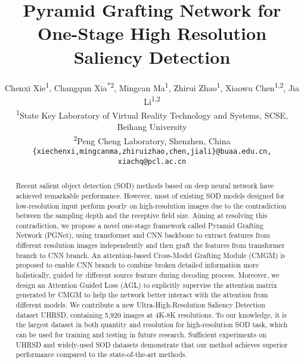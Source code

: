 \documentclass[10pt,twocolumn,letterpaper]{article}
\begin{document}
\title{Pyramid Grafting Network for One-Stage High Resolution \\
Saliency Detection}

\author{Chenxi Xie\textsuperscript{1}, Changqun Xia\textsuperscript{*2}, Mingcan Ma\textsuperscript{1}, Zhirui Zhao\textsuperscript{1}, Xiaowu Chen\textsuperscript{1,2}, Jia Li\textsuperscript{1,2} \\
\textsuperscript{1}State Key Laboratory of Virtual Reality Technology and Systems, SCSE, Beihang University\\
\textsuperscript{2}Peng Cheng Laboratory, Shenzhen, China\\
{\tt\small \{xiechenxi,mingcanma,zhiruizhao,chen,jiali\}@buaa.edu.cn, xiachq@pcl.ac.cn}}




\maketitle

\begin{abstract}
   Recent salient object detection (SOD) methods based on deep neural network have achieved remarkable performance. However, most of existing SOD models designed for low-resolution input perform poorly on high-resolution images due to the contradiction between the sampling depth and the receptive field size. Aiming at resolving this contradiction, we propose a novel one-stage framework called Pyramid Grafting Network (PGNet), using transformer and CNN backbone to extract features from different resolution images independently and then graft the features from transformer branch to CNN branch. An attention-based Cross-Model Grafting Module (CMGM) is proposed to enable CNN branch to combine broken detailed information more holistically, guided by different source feature during decoding process. Moreover, we design an Attention Guided Loss (AGL) to explicitly supervise the attention matrix generated by CMGM to help the network better interact with the attention from different models. We contribute a new Ultra-High-Resolution Saliency Detection dataset UHRSD, containing 5,920 images at 4K-8K resolutions. To our knowledge, it is the largest dataset in both quantity and resolution for high-resolution SOD task, which can be used for training and testing in future research. Sufficient experiments on UHRSD and widely-used SOD datasets demonstrate that our method achieves superior performance compared to the state-of-the-art methods.
   

\end{abstract}
\end{document}
